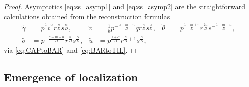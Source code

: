 \documentclass[11pt]{article}
\def\tg{{\tilde{\gamma}}}
\def\tv{{\tilde{v}}}
\def\tth{{\tilde{\theta}}}
\def\ts{{\tilde{\sigma}}}
\def\tu{{\tilde{u}}}
\theoremstyle{remark}
\begin{document}
\begin{proof}
Asymptotics \eqref{eq:ss_asymp1} and \eqref{eq:ss_asymp2} are the straightforward calculations obtained from the reconstruction formulas
\begin{align*}
 \tg&=p^{\frac{1+\alpha}{D}}r^{\frac{n}{D}}s^{\frac{\alpha}{D}}, & \tv &= \frac{1}{b} p^{-\frac{\alpha-m-n}{D}}qr^{\frac{n}{D}}s^{\frac{\alpha}{D}}, & \tth&=p^{\frac{1+m+n}{D}}r^{\frac{2n}{D}}s^{-\frac{1-m-n}{D}}, \\ \ts&=p^{-\frac{\alpha-m-n}{D}}r^{\frac{n}{D}}s^{\frac{\alpha}{D}},  & \tu&=p^{\frac{1+\alpha}{D}}r^{\frac{n}{D}+1}s^{\frac{\alpha}{D}},
\end{align*}
via \eqref{eq:CAPtoBAR} and \eqref{eq:BARtoTIL}.
%
%
%
\end{proof}

\subsection{Emergence of localization}
\label{sec:emloc}
\end{document}
